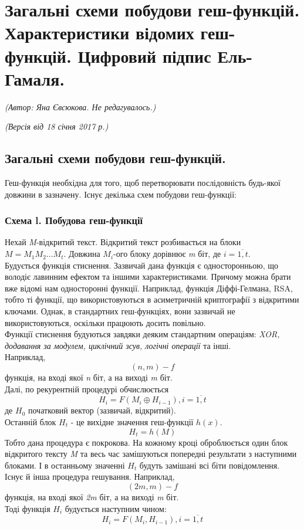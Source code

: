 \section{Загальні схеми побудови геш-функцій. Характеристики відомих геш-функцій. Цифровий підпис Ель-Гамаля.}
\begin{flushright}
\emph{(Автор: Яна Євсюкова. Не редагувалось.)}
\par \emph{(Версія від 18 січня 2017 р.)}
\end{flushright}

\subsection{Загальні схеми побудови геш-функцій.}
Геш-функція необхідна для того, щоб перетворювати послідовність будь-якої довжини в зазначену. Існує декілька схем побудови геш-функції:
\subsubsection*{Схема l. Побудова геш-функції}
Нехай \textit{M}-відкритий текст. Відкритий текст розбивається на блоки \textit{$M=M_1M_2\ldots M_t$}. Довжина \textit{$M_i$}-ого блоку дорівнює \textit{m} біт, де \textit{$i=\overline{1,t}$}.\\
Будується функція стиснення. Зазвичай дана функція є односторонньою, що володіє лавинним ефектом та іншими характеристиками. Причому можна брати вже відомі нам односторонні функції. Наприклад, функція Діффі-Гелмана, RSA, тобто ті функції, що використовуються в асиметричній криптографії з відкритими ключами. Однак, в стандартних геш-функціях, вони зазвичай не використовуються, оскільки працюють досить повільно.\\
Функції стиснення будуються завдяки деяким стандартним операціям: \textit{XOR, додавання за модулем, циклічний зсув, логічні операції} та інші.\\
Наприклад,\\ \textit{$$(n,m)-f$$} функція, на вході якої \textit{n} біт, а на виході \textit{m} біт.\\
Далі, по рекурентній процедурі обчислюється $$H_i=F(M_i \oplus H_{i-1}), \textit{$i=\overline{1,t}$}$$
де \textit{$H_0$} початковий вектор (зазвичай, відкритий).\\
Останній блок \textit{$H_t$} - це вихідне значення геш-функції \textit{$h(x)$}.$$H_t=h(M)$$
Тобто дана процедура є покрокова. На кожному кроці оброблюється один блок відкритого тексту \textit{M} та весь час замішуються попередні результати з наступними блоками. І в останньому значенні \textit{$H_t$} будуть замішані всі біти повідомлення.\\
Існує й інша процедура гешування. Наприклад, 
\textit{$$(2m,m)-f$$} функція, на вході якої \textit{2m} біт, а на виході \textit{m} біт.\\
Тоді функція \textit{$H_i$} будується наступним чином:
$$H_i=F(M_i , H_{i-1}), \textit{$i=\overline{1,t}$}$$
